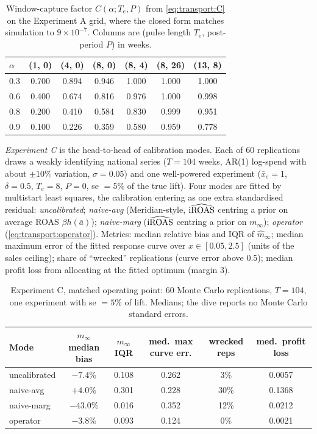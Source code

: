 \begin{table}[htbp]
\centering\small
\caption{Window-capture factor $C(\alpha; T_e, P)$ from \cref{eq:transport:C} on the Experiment A grid, where the closed form matches simulation to $9\times10^{-7}$. Columns are (pulse length $T_e$, post-period $P$) in weeks.}
\label{transport:tab:C}
\begin{tabular}{lcccccc}
\toprule
$\alpha$ & (1, 0) & (4, 0) & (8, 0) & (8, 4) & (8, 26) & (13, 8) \\
\midrule
0.3 & 0.700 & 0.894 & 0.946 & 1.000 & 1.000 & 1.000 \\
0.6 & 0.400 & 0.674 & 0.816 & 0.976 & 1.000 & 0.998 \\
0.8 & 0.200 & 0.410 & 0.584 & 0.830 & 0.999 & 0.951 \\
0.9 & 0.100 & 0.226 & 0.359 & 0.580 & 0.959 & 0.778 \\
\bottomrule
\end{tabular}
\end{table}

\emph{Experiment C} is the head-to-head of calibration modes. Each of 60 replications draws a weakly identifying national series ($T = 104$ weeks, AR(1) log-spend with about $\pm10\%$ variation, $\sigma = 0.05$) and one well-powered experiment ($\bar x_e = 1$, $\delta = 0.5$, $T_e = 8$, $P = 0$, se $= 5\%$ of the true lift). Four modes are fitted by multistart least squares, the calibration entering as one extra standardised residual: \emph{uncalibrated}; \emph{naive-avg} (Meridian-style, $\widehat{\mathrm{iROAS}}$ centring a prior on average ROAS $\beta h(\bar a)$); \emph{naive-marg} ($\widehat{\mathrm{iROAS}}$ centring a prior on $m_\infty$); \emph{operator} (\cref{eq:transport:operator}). Metrics: median relative bias and IQR of $\hat m_\infty$; median maximum error of the fitted response curve over $x \in [0.05, 2.5]$ (units of the sales ceiling); share of ``wrecked'' replications (curve error above 0.5); median profit loss from allocating at the fitted optimum (margin 3).

\begin{table}[htbp]
\centering\small
\caption{Experiment C, matched operating point: 60 Monte Carlo replications, $T = 104$, one experiment with se $= 5\%$ of lift. Medians; the dive reports no Monte Carlo standard errors.}
\label{transport:tab:modes}
\begin{tabular}{lccccc}
\toprule
Mode & $m_\infty$ median bias & $m_\infty$ IQR & med.\ max curve err. & wrecked reps & med.\ profit loss \\
\midrule
uncalibrated & $-7.4\%$ & 0.108 & 0.262 & 3\% & 0.0057 \\
naive-avg & $+4.0\%$ & 0.301 & 0.228 & 30\% & 0.1368 \\
naive-marg & $-43.0\%$ & 0.016 & 0.352 & 12\% & 0.0212 \\
operator & $-3.8\%$ & 0.093 & 0.124 & 0\% & 0.0021 \\
\bottomrule
\end{tabular}
\end{table}

